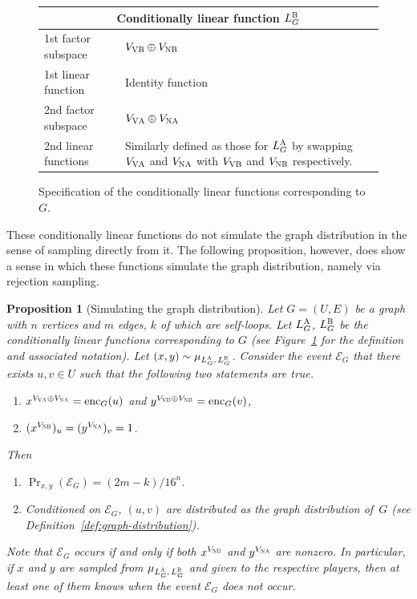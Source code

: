\documentclass[11pt]{article}
\newtheorem{proposition}[theorem]{Proposition}
\theoremstyle{definition}
\newcommand{\labelstyle}[1]{\ensuremath{\textsc{#1}}\xspace}
\newcommand{\vertex}[1]{\labelstyle{V#1}}
\newcommand{\edge}[1]{\labelstyle{N#1}}
\newcommand{\alice}{\labelstyle{A}}
\newcommand{\bob}{\labelstyle{B}}
\newenvironment{gamespec}{
  \begin{mdframed}[style=figstyle]}{
  \end{mdframed}}
\begin{document}
\begin{figure}[!htb]
\begin{gamespec}
    \begin{tabularx}{\textwidth}{p{3.8cm}X}
      \multicolumn{2}{c}{\textbf{Conditionally linear function $L^\bob_G$}}\\
      \midrule
      1st factor subspace & $V_{\vertex{\bob}} \oplus V_{\edge{\bob}}$\\
      1st linear function & Identity function\\
      \midrule
      2nd factor subspace & $V_{\vertex{\alice}} \oplus V_{\edge{\alice}}$\\
      2nd linear functions & Similarly defined as those for $L^\alice_G$ by swapping
      $V_{\vertex{\alice}}$ and $V_{\edge{\alice}}$ with $V_{\vertex{\bob}}$ and
      $V_{\edge{\bob}}$ respectively.\\
      \midrule
    \end{tabularx}
  \end{gamespec}
  \caption{Specification of the conditionally linear functions corresponding
    to~$G$.}
  \label{fig:graph-distribution}
\end{figure}

These conditionally linear functions do not simulate the graph distribution
in the sense of sampling directly from it.
The following proposition, however, does show a sense in which these functions
simulate the graph distribution, namely via rejection sampling.

\begin{proposition}[Simulating the graph distribution]
  \label{prop:simulating-graph}
  Let $G = (U, E)$ be a graph with $n$ vertices and $m$ edges, $k$ of which
  are self-loops.
  Let $L^\alice_G$, $L^\bob_G$ be the conditionally linear functions
  corresponding to $G$ (see Figure~\ref{fig:graph-distribution} for the
  definition and associated notation).
  Let $(x, y) \sim \mu_{L^\alice_G,\, L^\bob_G}$.
  Consider the event $\mathcal{E}_G$ that there exists $u, v \in U$ such that
  the following two statements are true.
  \begin{enumerate}[label=(\roman*)]
  \item $x^{V_{\vertex{\alice}} \oplus V_{\edge{\alice}}} = \mathrm{enc}_G(u)$
   	and $y^{V_{\vertex{\bob}} \oplus V_{\edge{\bob}}} = \mathrm{enc}_G(v)$,
  \item  $(x^{V_{\edge{\bob}}})_u = (y^{V_{\edge{\alice}}})_v = 1$.
  \end{enumerate}
  Then
  \begin{enumerate}
  \item \label{item:graph-prob} $\Pr_{x, y} (\mathcal{E}_G) = (2m-k)/16^n$.
  \item \label{item:edge-dist} Conditioned on $\mathcal{E}_G$, $(u, v)$ are
    distributed as the graph distribution of~$G$ (see
    Definition~\ref{def:graph-distribution}).
  \end{enumerate}
  Note that $\mathcal{E}_G$ occurs if and only if both $x^{V_\edge{\bob}}$ and
  $y^{V_\edge{\alice}}$ are nonzero.
  In particular, if $x$ and $y$ are sampled from $\mu_{L^\alice_G,\, L^\bob_G}$
  and given to the respective players, then at least one of them knows when the
  event $\mathcal{E}_G$ does \emph{not} occur.
\end{proposition}
\end{document}
